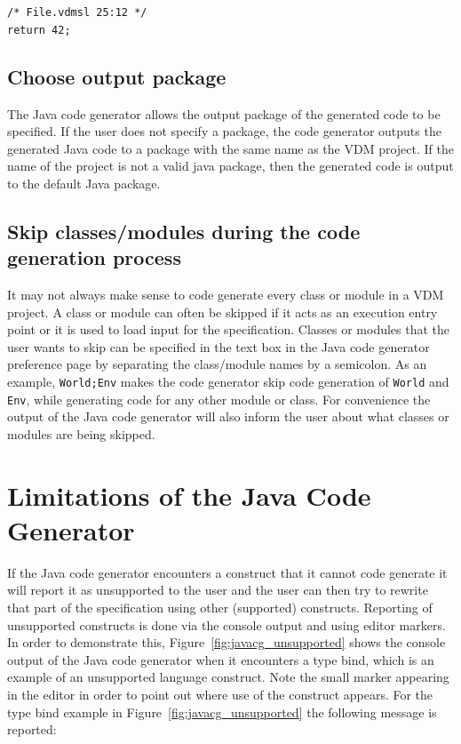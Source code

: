\noindent \texttt{/* File.vdmsl 25:12 */\\return 42;}

\subsection{Choose output package}
\label{sec:javapackage}

The Java code generator allows the output package of the generated
code to be specified. If the user does not specify a package, the code
generator outputs the generated Java code to a package with the same
name as the VDM project. If the name of the project is not a valid
java package, then the generated code is output to the default Java
package.

\subsection{Skip classes/modules during the code generation process}

It may not always make sense to code generate every class or module in
a VDM project. A class or module can often be skipped if it acts as an
execution entry point or it is used to load input for the
specification. Classes or modules that the user wants to skip can be
specified in the text box in the Java code generator preference page
by separating the class/module names by a semicolon. As an example,
\texttt{World;Env} makes the code generator skip code generation of
\texttt{World} and \texttt{Env}, while generating code for any other
module or class. For convenience the output of the Java code generator
will also inform the user about what classes or modules are being
skipped.

\section{Limitations of the Java Code Generator}

If the Java code generator encounters a construct that it cannot code
generate it will report it as unsupported to the user and the user can
then try to rewrite that part of the specification using other
(supported) constructs. Reporting of unsupported constructs is done
via the console output and using editor markers. In order to
demonstrate this, Figure~\ref{fig:javacg_unsupported} shows the
console output of the Java code generator when it encounters a type
bind, which is an example of an unsupported language construct. Note
the small marker appearing in the editor in order to point out where
use of the construct appears. For the type bind example in
Figure~\ref{fig:javacg_unsupported} the following message is reported:\\

